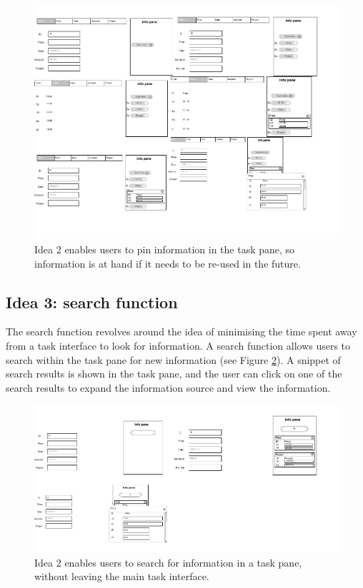 \begin{figure}
\centering
\includegraphics[width=\textwidth]{images/ch56/ch56_Idea2.pdf}
\caption{Idea 2 enables users to pin information in the task pane, so information is at hand if it needs to be re-used in the future.}
\label{fig:ch56_Idea2}
\end{figure}


\subsection{Idea 3: search function}
The search function revolves around the idea of minimising the time spent away from a task interface to look for information. A search function allows users to search within the task pane for new information (see Figure \ref{fig:ch56_Idea3}). 
A snippet of search results is shown in the task pane, and the user can click on one of the search results to expand the information source and view the information.

\begin{figure}
\centering
\includegraphics[width=\textwidth]{images/ch56/ch56_Idea3.pdf}
\caption{Idea 2 enables users to search for information in a task pane, without leaving the main task interface.}
\label{fig:ch56_Idea3}
\end{figure}

